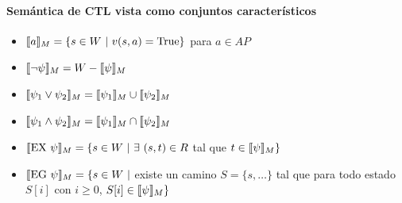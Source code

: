 \paragraph{Semántica de CTL vista como conjuntos característicos}
\begin{itemize}
\item $\llbracket a \rrbracket_{M} = \{s \in W ~|~ v(s,a) = \text{True} \}$ para $a\in AP$
\item $\llbracket \lnot\psi \rrbracket_{M} = W - \llbracket \psi \rrbracket_{M}$
\item $\llbracket \psi_1\lor\psi_2 \rrbracket_{M} = \llbracket \psi_1 \rrbracket_{M} \cup \llbracket \psi_2 \rrbracket_{M}$
\item $\llbracket \psi_1\land\psi_2 \rrbracket_{M} = \llbracket \psi_1 \rrbracket_{M} \cap \llbracket \psi_2 \rrbracket_{M}$
\item $\llbracket \text{EX }\psi \rrbracket_{M} = \{s\in W~|~\exists~(s,t)\in R$ tal que $t\in\llbracket \psi \rrbracket_{M}\}$
\item $\llbracket \text{EG }\psi \rrbracket_{M} = \{s\in W~|$ existe un camino $S=\{s,\dots\}$ tal que para todo estado $S[i]$ con $i\geq 0$, $S[i]\in\llbracket \psi \rrbracket_{M} \}$
%


\end{itemize}
